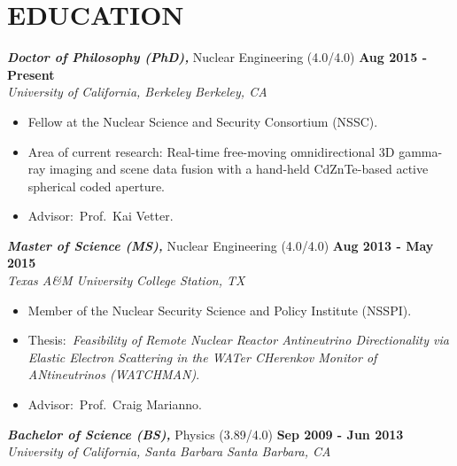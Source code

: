 \section{\small{EDUCATION}}

{\sl\bf Doctor of Philosophy (PhD),} Nuclear Engineering (4.0/4.0) \hfill {\bf Aug 2015 - Present}\\
{\sl University of California, Berkeley} \hfill {\sl Berkeley, CA}\\[-2.8ex]
\vspace{2.5pt}
\begin{itemize}[leftmargin=4ex] \itemsep -2pt %
\item Fellow at the Nuclear Science and Security Consortium (NSSC).
\item Area of current research: Real-time free-moving omnidirectional 3D gamma-ray imaging and scene data fusion with a hand-held CdZnTe-based active spherical coded aperture.
\item Advisor:~Prof.~Kai Vetter.
\end{itemize}

{\sl\bf Master of Science (MS),} Nuclear Engineering (4.0/4.0) \hfill {\bf Aug 2013 - May 2015}\\
{\sl Texas A\&M University} \hfill {\sl College Station, TX}\\[-2.8ex]
\vspace{2.5pt}
\begin{itemize}[leftmargin=4ex] \itemsep -2pt %
\item Member of the Nuclear Security Science and Policy Institute (NSSPI).
\item Thesis:~\emph{Feasibility of Remote Nuclear Reactor Antineutrino Directionality via Elastic Electron Scattering in the WATer CHerenkov Monitor of ANtineutrinos (WATCHMAN)}.
\item Advisor:~Prof.~Craig Marianno.
\end{itemize}

{\sl\bf Bachelor of Science (BS),} Physics (3.89/4.0) \hfill {\bf Sep 2009 - Jun 2013} \\
{\sl University of California, Santa Barbara} \hfill {\sl Santa Barbara, CA}\\[-2.8ex]
\vspace{2pt}

